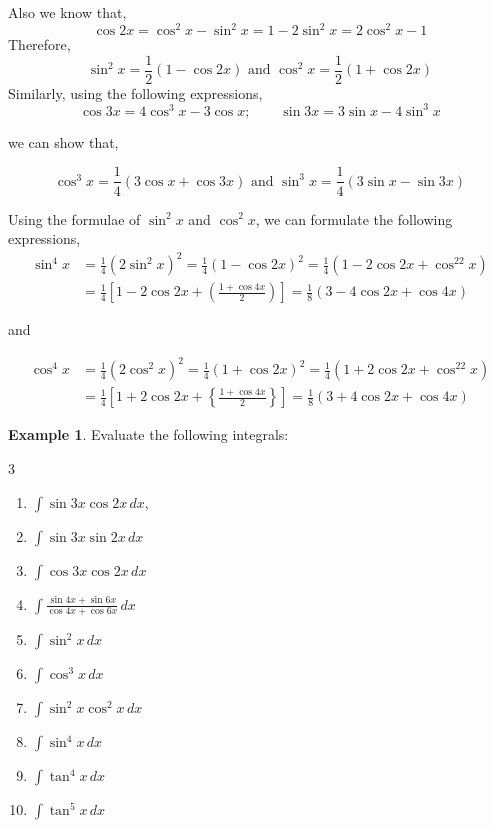 \documentclass{book}
\theoremstyle{definition}
\newtheorem{example}{Example}[section]
\begin{document}
Also we know that,
\[
\cos 2x=\cos^2x-\sin^2x=1-2\sin^2x=2\cos^2x-1
\]
Therefore,
\[
\sin^2x=\frac{1}{2}(1-\cos2x) \text{ and } \cos^2x=\frac{1}{2}(1+\cos2x)
\]
Similarly, using the following expressions,
\[
\cos3x=4\cos^3x-3\cos x; \qquad \sin 3x=3\sin x-4\sin^3x
\]

we can show that, 

\[
\cos^3x=\frac{1}{4}(3\cos x+\cos 3x) \text{ and } \sin ^3x=\frac{1}{4}(3\sin x-\sin 3x)
\]


Using the formulae of $\sin^2x$ and $\cos^2x$, we can formulate the following expressions,
\begin{align*}
    \sin^4x &= \frac{1}{4}(2\sin^2x)^2=\frac{1}{4}(1-\cos 2x)^2 = \frac{1}{4}(1-2\cos 2x+\cos^22x) \\
    &= \frac{1}{4}\left[1-2\cos 2x+\left(\frac{1+\cos 4x}{2}\right)\right] = \frac{1}{8}(3-4\cos 2x+\cos 4x)
\end{align*}

and 

\begin{align*}
    \cos^4x &= \frac{1}{4}(2\cos^2x)^2=\frac{1}{4}(1+\cos 2x)^2 = \frac{1}{4}(1+2\cos 2x+\cos^22x) \\
    &= \frac{1}{4}\left[1+2\cos 2x+\left\{\frac{1+\cos 4x}{2}\right\}\right] = \frac{1}{8}(3+4\cos 2x+\cos 4x)
\end{align*}

\begin{example}
Evaluate the following integrals:
\begin{multicols}{3}

\begin{enumerate}[label=(\roman*)]
    \item $\displaystyle\int \sin 3x\cos 2x \, dx$,
    \item $\displaystyle\int \sin 3x\sin 2x \,dx$
    \item $\int\cos 3x\cos 2x \, dx$
    \item $\displaystyle\int \frac{\sin 4x+\sin 6x}{\cos 4x+\cos 6x} \, dx$
    \item $\displaystyle\int\sin^2x\, dx$
    \item $\displaystyle\int\cos^3x \, dx$
    \item $\displaystyle\int \sin^2 x\cos^2 x \, dx$
    \item $\displaystyle\int\sin^4 x\, dx$
    \item $\displaystyle\int \tan^4x \, dx$
    \item $\displaystyle\int \tan^5x \, dx$
   
 
\end{enumerate}
\end{multicols}    
\end{example}
\end{document}
